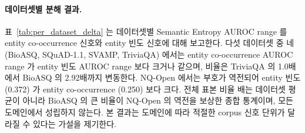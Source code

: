 \documentclass[oneside,ko,under]{snuthesis}
\begin{document}
\paragraph{데이터셋별 분해 결과.}
표~\ref{tab:per_dataset_delta} 는 데이터셋별 Semantic Entropy AUROC range 를 entity co-occurrence 신호와 entity 빈도 신호에 대해 보고한다. 다섯 데이터셋 중 네 (BioASQ, SQuAD-1.1, SVAMP, TriviaQA) 에서는 entity co-occurrence AUROC range 가 entity 빈도 AUROC range 보다 크거나 같으며, 비율은 TriviaQA 의 1.0배에서 BioASQ 의 2.92배까지 변동한다. NQ-Open 에서는 부호가 역전되어 entity 빈도 (0.372) 가 entity co-occurrence (0.250) 보다 크다. 전체 표본 비율 \HeadlineEntityPairOverEntityFreqRatio{}배는 데이터셋 평균이 아니라 BioASQ 의 큰 비율이 NQ-Open 의 역전을 보상한 종합 통계이며, 모든 도메인에서 성립하지 않는다. 본 결과는 도메인에 따라 적절한 corpus 신호 단위가 달라질 수 있다는 가설을 제기한다.

\begin{table}[htbp]
\centering
\small
\caption[데이터셋별 Semantic Entropy / Semantic Energy AUROC range]{데이터셋별 Semantic Entropy 와 Semantic Energy 의 AUROC range 를 entity co-occurrence 신호와 entity 빈도 신호에서 비교한 결과. NQ-Open 에서는 entity 빈도 AUROC range 가 entity co-occurrence AUROC range 보다 크다 (★). 다만 NQ-Open 의 Semantic Energy AUROC range 0.514 와 entity 빈도 AUROC range 0.372 는 정답 분포의 불균형에서 일부 비롯된다. NQ-Open 의 정답률은 0.240 이고, 두 번째 구간 (20--30) 은 표본 120개 중 정답이 7개에 불과하여 AUROC 가 0.266 인 outlier 가 발생하였다. 세 번째 구간 (30--40) 은 단일 클래스로 산출 대상에서 제외되었다. 이 outlier 구간을 제외하면 NQ-Open 의 AUROC range 는 다른 데이터셋과 비슷한 0.10--0.15 수준으로 줄어든다. 따라서 본 표는 표본 종합 비율이 데이터셋 평균과 일치하지 않는다는 점을 보이는 용도에 한정한다.}
\label{tab:per_dataset_delta}
\end{table}
\end{document}

